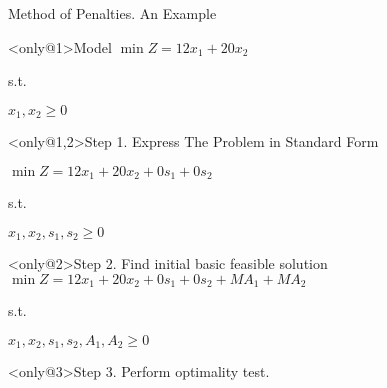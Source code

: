 \begin{frame}{Method of Penalties. An Example}{}


  \begin{block}<only@1>{Model}
    $\min Z = 12x_1 + 20x_2$

s.t.

$    x_1, x_2  \geq 0$
  \end{block}
\begin{block}<only@1,2>{Step 1. Express The Problem in Standard Form} \justifying

  $\min Z = 12x_1 + 20x_2 + 0s_1 + 0s_2$

  s.t.

$    x_1, x_2, s_1, s_2  \geq 0$
\end{block}

\begin{block}<only@2>{Step 2. Find initial basic feasible solution} \justifying
    $\min Z = 12x_1 + 20x_2 + 0s_1 + 0s_2 +MA_1 + MA_2$

  s.t.

$    x_1, x_2, s_1, s_2, A_1, A_2   \geq 0$
\end{block}

\begin{block}<only@3>{Step 3. Perform optimality test.} \justifying
  {\centering
  \par}
\end{block}


\end{frame}
